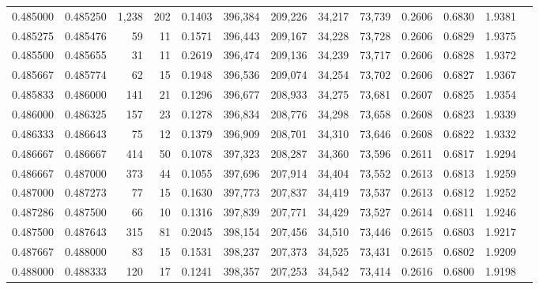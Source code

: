 \begin{tabular}{rrrrrrrrrrrrr}
0.485000 & 0.485250 & 1,238 & 202 &                                     0.1403 & 396,384 & 209,226 &  34,217 &  73,739 & 0.2606 & 0.6830 & 1.9381 \\
0.485275 & 0.485476 &    59 &  11 &                                     0.1571 & 396,443 & 209,167 &  34,228 &  73,728 & 0.2606 & 0.6829 & 1.9375 \\
0.485500 & 0.485655 &    31 &  11 &                                     0.2619 & 396,474 & 209,136 &  34,239 &  73,717 & 0.2606 & 0.6828 & 1.9372 \\
0.485667 & 0.485774 &    62 &  15 &                                     0.1948 & 396,536 & 209,074 &  34,254 &  73,702 & 0.2606 & 0.6827 & 1.9367 \\
0.485833 & 0.486000 &   141 &  21 &                                     0.1296 & 396,677 & 208,933 &  34,275 &  73,681 & 0.2607 & 0.6825 & 1.9354 \\
0.486000 & 0.486325 &   157 &  23 &                                     0.1278 & 396,834 & 208,776 &  34,298 &  73,658 & 0.2608 & 0.6823 & 1.9339 \\
0.486333 & 0.486643 &    75 &  12 &                                     0.1379 & 396,909 & 208,701 &  34,310 &  73,646 & 0.2608 & 0.6822 & 1.9332 \\
0.486667 & 0.486667 &   414 &  50 &                                     0.1078 & 397,323 & 208,287 &  34,360 &  73,596 & 0.2611 & 0.6817 & 1.9294 \\
0.486667 & 0.487000 &   373 &  44 &                                     0.1055 & 397,696 & 207,914 &  34,404 &  73,552 & 0.2613 & 0.6813 & 1.9259 \\
0.487000 & 0.487273 &    77 &  15 &                                     0.1630 & 397,773 & 207,837 &  34,419 &  73,537 & 0.2613 & 0.6812 & 1.9252 \\
0.487286 & 0.487500 &    66 &  10 &                                     0.1316 & 397,839 & 207,771 &  34,429 &  73,527 & 0.2614 & 0.6811 & 1.9246 \\
0.487500 & 0.487643 &   315 &  81 &                                     0.2045 & 398,154 & 207,456 &  34,510 &  73,446 & 0.2615 & 0.6803 & 1.9217 \\
0.487667 & 0.488000 &    83 &  15 &                                     0.1531 & 398,237 & 207,373 &  34,525 &  73,431 & 0.2615 & 0.6802 & 1.9209 \\
0.488000 & 0.488333 &   120 &  17 &                                     0.1241 & 398,357 & 207,253 &  34,542 &  73,414 & 0.2616 & 0.6800 & 1.9198 \\

\end{tabular}
